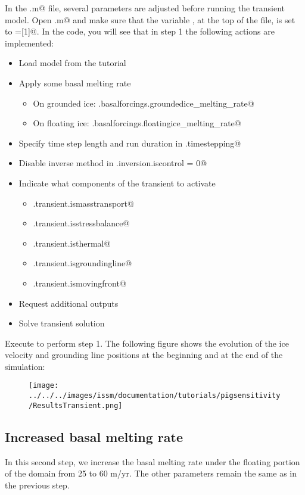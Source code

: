 In the \verb@runme.m@ file, several parameters are adjusted before running the transient model. Open \verb@runme.m@ and make sure that the variable \verb@steps@, at the top of the file, is set to \verb@steps=[1]@. In the code, you will see that in step 1 the following actions are implemented:
\begin{itemize}
	\item Load model from the \verb@Pig@ tutorial
	\item Apply some basal melting rate
		\begin{itemize}
			\item On grounded ice: \verb@md.basalforcings.groundedice_melting_rate@
			\item On floating ice: \verb@md.basalforcings.floatingice_melting_rate@
		\end{itemize}
	\item Specify time step length and run duration in \verb@md.timestepping@
	\item Disable inverse method in \verb@md.inversion.iscontrol = 0@
	\item Indicate what components of the transient to activate
		\begin{itemize}
			\item \verb@md.transient.ismasstransport@
			\item \verb@md.transient.isstressbalance@
			\item \verb@md.transient.isthermal@
			\item \verb@md.transient.isgroundingline@
			\item \verb@md.transient.ismovingfront@
		\end{itemize}
	\item Request additional outputs
	\item Solve transient solution
\end{itemize}

Execute \verb@runme@ to perform step 1. The following figure shows the evolution of the ice velocity and grounding line positions at the beginning and at the end of the simulation:
\begin{figure}[H]
	\begin{center}
		\texttt{[image: ../../../images/issm/documentation/tutorials/pigsensitivity/ResultsTransient.png]}
	\end{center}
\end{figure}
\subsection{Increased basal melting rate}%
In this second step, we increase the basal melting rate under the floating portion of the domain from 25 to 60 m/yr. The other parameters remain the same as in the previous step.

